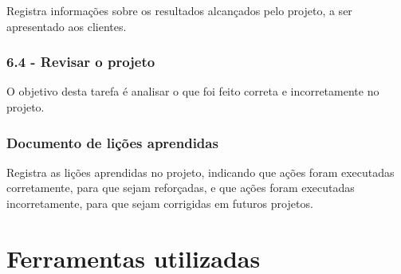 Registra informações sobre os resultados alcançados pelo projeto, a ser apresentado aos clientes.

\subsubsection*{\textbf{6.4 - Revisar o projeto}}

O objetivo desta tarefa é analisar o que foi feito correta e incorretamente no projeto.

\subsubsection*{Documento de lições aprendidas}

Registra as lições aprendidas no projeto, indicando que ações foram executadas corretamente, para que sejam reforçadas, e que ações foram executadas incorretamente, para que sejam corrigidas em futuros projetos.

\section{Ferramentas utilizadas}

\cite{scikit-learn}
\cite{pandas}
